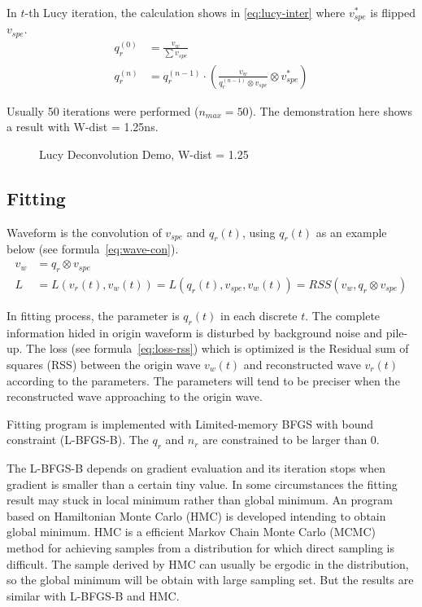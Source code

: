 In $t$-th Lucy iteration, the calculation shows in \eqref{eq:lucy-inter} where $v^{*}_{spe}$ is flipped $v_{spe}$. 
\begin{align}
    q_{r}^{(0)} &= \frac{v_{w}}{\sum v_{spe}} \\
    q_{r}^{(n)} &= q_{r}^{(n-1)} \cdot \left(\frac{v_{w}}{q_{r}^{(n-1)} \otimes v_{spe}} \otimes v^{*}_{spe}\right) \label{eq:lucy-inter}
\end{align}

Usually 50 iterations were performed ($n_{max}=50$). The demonstration here shows a result with W-dist = 1.25ns. 

\begin{figure}[H]
    \centering
    \scalebox{0.4}{}
    \caption{Lucy Deconvolution Demo, W-dist = 1.25}
\end{figure}

\subsection{Fitting}
Waveform is the convolution of $v_{spe}$ and $q_{r}(t)$, using $q_{r}(t)$ as an example below (see formula~\eqref{eq:wave-con}). 
\begin{align}
    v_{w} &= q_{r} \otimes v_{spe} \label{eq:wave-con} \\
    L &= L(v_{r}(t), v_{w}(t)) = L(q_{r}(t), v_{spe}, v_{w}(t)) = RSS(v_{w}, q_{r} \otimes v_{spe}) \label{eq:loss-rss}
\end{align}

In fitting process, the parameter is $q_{r}(t)$ in each discrete $t$. The complete information hided in origin waveform is disturbed by background noise and pile-up. The loss (see formula~\ref{eq:loss-rss}) which is optimized is the Residual sum of squares (RSS) between the origin wave $v_{w}(t)$ and reconstructed wave $v_{r}(t)$ according to the parameters. The parameters will tend to be preciser when the reconstructed wave approaching to the origin wave. 

Fitting program is implemented with Limited-memory BFGS with bound constraint\cite{byrd_limited_1995} (L-BFGS-B). The $q_{r}$ and $n_{r}$ are constrained to be larger than 0. 

The L-BFGS-B depends on gradient evaluation and its iteration stops when gradient is smaller than a certain tiny value. In some circumstances the fitting result may stuck in local minimum rather than global minimum. An program based on Hamiltonian Monte Carlo (HMC) is developed intending to obtain global minimum. HMC is a efficient Markov Chain Monte Carlo (MCMC) method for achieving samples from a distribution for which direct sampling is difficult\cite{neal_mcmc_2012}. The sample derived by HMC can usually be ergodic in the distribution, so the global minimum will be obtain with large sampling set. But the results are similar with L-BFGS-B and HMC. 

